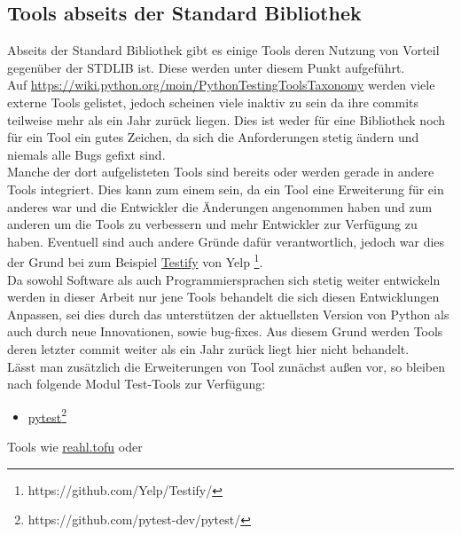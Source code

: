 \subsection{Tools abseits der Standard Bibliothek}\label{python-tools:extlib}
Abseits der Standard Bibliothek gibt es einige Tools deren Nutzung von
Vorteil gegenüber der STDLIB ist. Diese werden unter diesem Punkt aufgeführt.
\newline
\\
Auf \url{https://wiki.python.org/moin/PythonTestingToolsTaxonomy} werden viele
externe Tools gelistet, jedoch scheinen viele inaktiv zu sein da ihre \glspl{commit}
teilweise mehr als ein Jahr zurück liegen. Dies ist weder für eine Bibliothek noch
für ein Tool ein gutes Zeichen, da sich die Anforderungen stetig ändern und niemals
alle Bugs gefixt sind.
\newline
\\
Manche der dort aufgelisteten Tools sind bereits oder werden gerade in andere Tools
integriert. Dies kann zum einem sein, da ein Tool eine Erweiterung für ein anderes
war und die Entwickler die Änderungen angenommen haben und zum anderen um die Tools
zu verbessern und mehr Entwickler zur Verfügung zu haben. Eventuell sind auch
andere Gründe dafür verantwortlich, jedoch war dies der Grund bei zum Beispiel
\href{https://github.com/Yelp/Testify/}{Testify}
von Yelp \footnote{https://github.com/Yelp/Testify/}.
\newline
\\
Da sowohl Software als auch Programmiersprachen sich stetig weiter entwickeln werden in
dieser Arbeit nur jene Tools behandelt die sich diesen Entwicklungen Anpassen, sei dies
durch das unterstützen der aktuellsten Version von Python als auch durch neue Innovationen,
sowie \Gls{bug}-fixes. Aus diesem Grund werden Tools deren letzter \Gls{commit} weiter
als ein Jahr zurück liegt hier nicht behandelt.
\newline
\\
Lässt man zusätzlich die Erweiterungen von Tool zunächst außen vor, so bleiben nach
\cite{wiki.python:PythonTestingToolsTaxonomy} folgende Modul Test-Tools zur Verfügung:
\begin{itemize}
    \item \href{https://github.com/pytest-dev/pytest/}{pytest}\footnote{https://github.com/pytest-dev/pytest/}
\end{itemize}
Tools wie \href{https://www.reahl.org/docs/4.0/devtools/tofu.d.html}{reahl.tofu} oder
